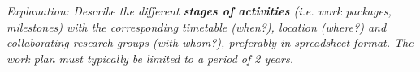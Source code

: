 % 
% 

\emph{Explanation: Describe the different \textbf{stages of activities} (i.e. work
packages, milestones) with the corresponding timetable (when?), location
(where?) and collaborating research groups (with whom?), preferably in
spreadsheet format.
The work plan must typically be limited to a period of 2 years.
} 





% 
